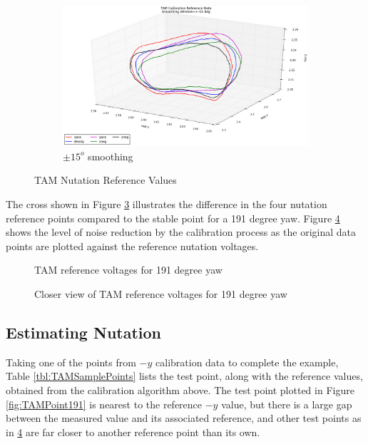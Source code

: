 \begin{figure}[H]
  \begin{subfigure}[h!]{0.8\textwidth}
    \includegraphics[width=\textwidth]{figures/tam_calibration_ref_15deg_smoothing.eps}
    \caption{$\pm 15^o$ smoothing}
    \label{fig:TAM15degCalibration}
  \end{subfigure}
  \caption{TAM Nutation Reference Values}
  \label{fig:TAMNutationReference}
\end{figure}

The cross shown in Figure \ref{fig:TAMRef191} illustrates the difference in the four nutation reference points compared to the stable point for a 191 degree yaw.  Figure \ref{fig:TAMPoints191} shows the level of noise reduction by the calibration process as the original data points are plotted against the reference nutation voltages.

\begin{figure}[H]
  \centerline{}
  \caption{TAM reference voltages for 191 degree yaw}
  \label{fig:TAMRef191}
\end{figure}

\begin{figure}[H]
  \centerline{}
  \caption{Closer view of TAM reference voltages for 191 degree yaw}
  \label{fig:TAMPoints191}
\end{figure}

\subsection{Estimating Nutation}

Taking one of the points from $-y$ calibration data to complete the example, Table \ref{tbl:TAMSamplePoints} lists the test point, along with the reference values, obtained from the calibration algorithm above.  The test point plotted in Figure \ref{fig:TAMPoint191} is nearest to the reference $-y$ value, but there is a large gap between the measured value and its associated reference, and other test points as in \ref{fig:TAMPoints191} are far closer to another reference point than its own.

